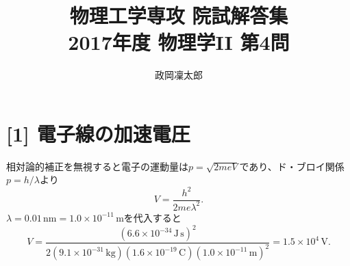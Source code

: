 \documentclass[11pt,a4paper]{article}
\title{物理工学専攻 院試解答集\\2017年度 物理学II 第4問}
\author{政岡凜太郎}
\date{}
\begin{document}
\maketitle

\section*{[1] 電子線の加速電圧}
相対論的補正を無視すると電子の運動量は$p=\sqrt{2meV}$であり、ド・ブロイ関係$p=h/\lambda$より
\begin{equation}
 V=\frac{h^2}{2me\lambda^2}.
\end{equation}
$\lambda=0.01\,\mathrm{nm}=1.0\times10^{-11}\,\mathrm m$を代入すると
\begin{equation}
 V=\frac{(6.6\times10^{-34}\,\mathrm{J\,s})^2}
 {2(9.1\times10^{-31}\,\mathrm{kg})(1.6\times10^{-19}\,\mathrm C)(1.0\times10^{-11}\,\mathrm m)^2}
 =1.5\times10^4\,\mathrm V.
\end{equation}
\end{document}
